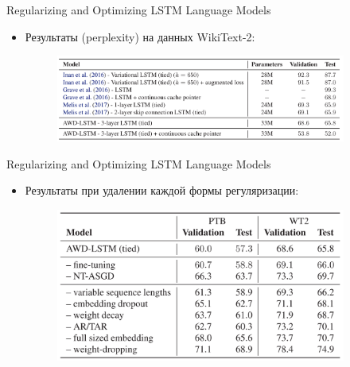 \begin{frame}[c]{Regularizing and Optimizing LSTM Language Models}
\begin{itemize}
	[square]
	\item Результаты (perplexity) на данных WikiText-2:
	\begin{figure}
		\centering
		\includegraphics[width=0.9\textwidth]{figures/awdres1.png}
	\end{figure}
\end{itemize}
\end{frame}

\begin{frame}[c]{Regularizing and Optimizing LSTM Language Models}
\begin{itemize}
	[square]
	\item Результаты при удалении каждой формы регуляризации:
	\begin{figure}
		\centering
		\includegraphics[width=0.9\textwidth]{figures/awdres2.png}
	\end{figure}
\end{itemize}
\end{frame}
